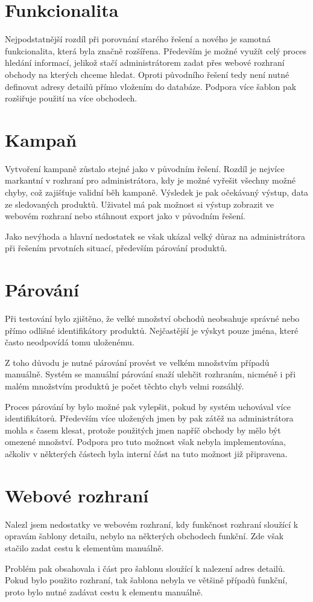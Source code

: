 \documentclass[thesis=B,czech]{FITthesis}[2012/06/26]
\begin{document}
\section{Funkcionalita}
Nejpodstatnější rozdíl při porovnání starého řešení a nového je samotná funkcionalita, která byla značně rozšířena. Především je možné
využít celý proces hledání informací, jelikož stačí administrátorem zadat přes webové rozhraní obchody na kterých chceme hledat.
Oproti původního řešení tedy není nutné definovat adresy detailů přímo vložením do databáze. 
Podpora více šablon pak rozšiřuje použití na více obchodech.

\section{Kampaň}
Vytvoření kampaně zůstalo stejné jako v původním řešení. Rozdíl je nejvíce markantní v rozhraní pro administrátora, kdy je
možné vyřešit všechny možné chyby, což zajišťuje validní běh kampaně. Výsledek je pak očekávaný výstup, data ze sledovaných
produktů. Uživatel má pak možnost si výstup zobrazit ve webovém rozhraní nebo stáhnout export jako v původním řešení.
\par
Jako nevýhoda a hlavní nedostatek se však ukázal velký důraz na administrátora při řešením prvotních situací, především párování produktů.
\par

\section{Párování}
Při testování bylo zjištěno, že velké množství obchodů neobsahuje správné nebo přímo odlišné identifikátory produktů. Nejčastější je výskyt pouze jména, které často neodpovídá tomu uloženému.
\par
Z toho důvodu je nutné párování provést ve velkém množstvím případů manuálně. Systém se manuální párování snaží ulehčit rozhraním, nicméně i při malém množstvím 
produktů je počet těchto chyb velmi rozsáhlý. 
\par
Proces párování by bylo možné pak vylepšit, pokud by systém uchovával více identifikátorů. Především více uložených jmen by pak zátěž na administrátora mohla s časem klesat, protože použitých jmen napříč obchody by mělo být omezené množství. 
Podpora pro tuto možnost však nebyla implementována, ačkoliv v některých částech byla interní část na tuto možnost již připravena.

\section{Webové rozhraní}
Nalezl jsem nedostatky ve webovém rozhraní, kdy funkčnost rozhraní sloužící k opravám šablony detailu, nebylo na některých obchodech funkční.
Zde však stačilo zadat cestu k elementům manuálně. 
\par
Problém pak obsahovala i část pro šablonu sloužící k nalezení adres detailů. Pokud bylo použito rozhraní, tak šablona nebyla ve většině
případů funkční, proto bylo nutné zadávat cestu k elementu manuálně.
\end{document}
